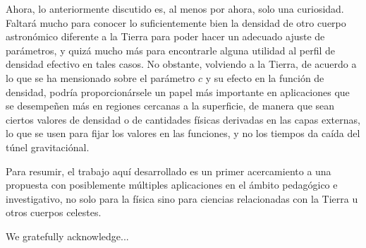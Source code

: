 \documentclass[aps,twocolumn,showpacs,preprintnumbers]{revtex4}
\begin{document}
    Ahora, lo anteriormente discutido es, al menos por ahora, solo una curiosidad. Faltará mucho para conocer lo suficientemente bien la densidad de otro cuerpo astronómico diferente a la Tierra para poder hacer un adecuado ajuste de parámetros, y quizá mucho más para encontrarle alguna utilidad al perfil de densidad efectivo en tales casos. No obstante, volviendo a la Tierra, de acuerdo a lo que se ha mensionado sobre el parámetro $c$ y su efecto en la función de densidad, podría proporcionársele un papel más importante en aplicaciones que se desempeñen más en regiones cercanas a la superficie, de manera que sean ciertos valores de densidad o de cantidades físicas derivadas en las capas externas, lo que se usen para fijar los valores en las funciones, y no los tiempos da caída del túnel gravitaciónal. 
    
    Para resumir, el trabajo aquí desarrollado es un primer acercamiento a una propuesta con posiblemente múltiples aplicaciones en el ámbito pedagógico e investigativo, no solo para la física sino para ciencias relacionadas con la Tierra u otros cuerpos celestes.
    
    
    


\begin{acknowledgments}

We gratefully acknowledge...

\end{acknowledgments}


\end{document}
